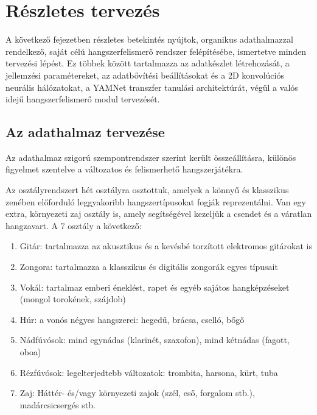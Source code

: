 \chapter{Részletes tervezés}
\label{chap:tervezes}A következő fejezetben részletes betekintés nyújtok, organikus adathalmazzal rendelkező, saját célú hangszerfelismerő rendszer felépítésébe, ismertetve minden tervezési lépést. Ez többek között tartalmazza az adatkészlet létrehozását, a jellemzési paramétereket, az adatbővítési beállításokat és a 2D konvolúciós neurális hálózatokat, a YAMNet transzfer tanulási architektúrát, végül a valós idejű hangszerfelismerő modul tervezését.

\section{Az adathalmaz tervezése}
\label{sec:dataset_design}

Az adathalmaz szigorú szempontrendszer szerint került összeállításra, különös figyelmet szentelve a változatos és felismerhető hangszerjátékra.

Az osztályrendszert hét osztályra osztottuk, amelyek a könnyű és klasszikus zenében előforduló leggyakoribb hangszertípusokat fogják reprezentálni. Van egy extra, környezeti zaj osztály is, amely segítségével kezeljük a csendet és a váratlan hangzavart. A 7 osztály a következő:

\begin{enumerate}
  \item[(1)] Gitár: tartalmazza az akusztikus és a kevésbé torzított elektromos gitárokat is
  \item[(2)] Zongora: tartalmazza a klasszikus és digitális zongorák egyes típusait
  \item[(3)] Vokál: tartalmaz emberi éneklést, rapet és egyéb sajátos hangképzéseket (mongol torokének, szájdob)
  \item[(4)] Húr: a vonós négyes hangszerei: hegedű, brácsa, cselló, bőgő
  \item[(5)] Nádfúvósok: mind egynádas (klarinét, szaxofon), mind kétnádas (fagott, oboa)
  \item[(6)] Rézfúvósok: legelterjedtebb változatok: trombita, harsona, kürt, tuba
  \item[(7)] Zaj: Háttér- és/vagy környezeti zajok (szél, eső, forgalom stb.), madárcsicsergés stb.
\end{enumerate}


